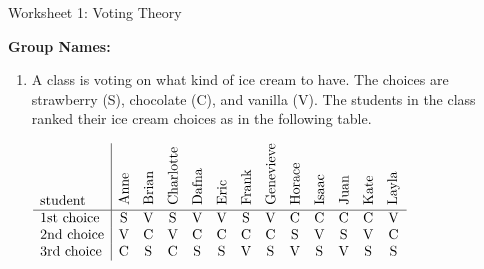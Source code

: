 \documentclass[12pt]{article}
\begin{document}
\begin{center}
{\Large  Worksheet 1:  Voting Theory		 	}
\end{center}



\noindent \textbf{Group Names:} \hrulefill \\
          

\begin{enumerate}     

\item A class is voting on what kind of ice cream to have. The choices are strawberry (S), chocolate (C), and vanilla (V). The students in the class ranked their ice cream choices as in the following table.

$
\begin{array}{l|cccccccccccc}
\text{student} & \rotatebox{90}{Anne} & \rotatebox{90}{Brian} &\rotatebox{90}{Charlotte}&\rotatebox{90}{Dafna}&\rotatebox{90}{Eric}&\rotatebox{90}{Frank}&\rotatebox{90}{Genevieve}&\rotatebox{90}{Horace}&\rotatebox{90}{Isaac} & \rotatebox{90}{Juan} & \rotatebox{90}{Kate} & \rotatebox{90}{Layla}\\ \hline
%
%
\text{1st choice}&  \text{S} & \text{V} & \text{S} & \text{V}
   & \text{V} & \text{S} & \text{V} &
   \text{C} & \text{C} & \text{C} & \text{C} & \text{V} \\
   \text{2nd choice} & \text{V} & \text{C} & \text{V} & \text{C}
   & \text{C} & \text{C} & \text{C} &
   \text{S} & \text{V} & \text{S} & \text{V} & \text{C} \\
   \text{3rd choice}& \text{C} & \text{S} & \text{C} & \text{S}
   & \text{S} & \text{V} & \text{S} &
   \text{V} & \text{S} & \text{V} &\text{S} & \text{S} \\\end{array}
$


\end{enumerate}
\end{document}
